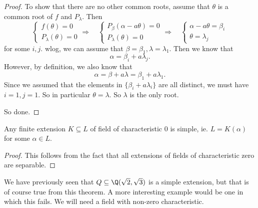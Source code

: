\documentclass[a4paper]{article}
\begin{document}
\begin{proof}
  To show that there are no other common roots, assume that $\theta$ is a common root of $f$ and $P_\lambda$. Then
  \[
    \begin{cases}
      f(\theta) = 0\\
      P_\lambda(\theta) = 0
    \end{cases}
    \Rightarrow\quad
    \begin{cases}
      P_\beta(\alpha - a\theta) = 0\\
      P_\lambda(\theta) = 0
    \end{cases}
    \Rightarrow\quad
    \begin{cases}
      \alpha - a\theta = \beta_i\\
      \theta = \lambda_j
    \end{cases}
  \]
  for some $i, j$. wlog, we can assume that $\beta = \beta_1, \lambda = \lambda_1$. Then we know that
  \[
    \alpha = \beta_i + a\lambda_j.
  \]
  However, by definition, we also know that
  \[
    \alpha = \beta + a\lambda = \beta_1 + a \lambda_1.
  \]
  Since we assumed that the elements in $\{\beta_i + a\lambda_i\}$ are all distinct, we must have $i = 1, j = 1$. So in particular $\theta = \lambda$. So $\lambda$ is the only root.

  So done.
\end{proof}

\begin{cor}
  Any finite extension $K \subseteq L$ of field of characteristic $0$ is simple, ie. $L = K(\alpha)$ for some $\alpha \in L$.
\end{cor}

\begin{proof}
  This follows from the fact that all extensions of fields of characteristic zero are separable.
\end{proof}

We have previously seen that $Q\subseteq \Q(\sqrt{2}, \sqrt{3})$ is a simple extension, but that is of course true from this theorem. A more interesting example would be one in which this fails. We will need a field with non-zero characteristic.
\end{document}
